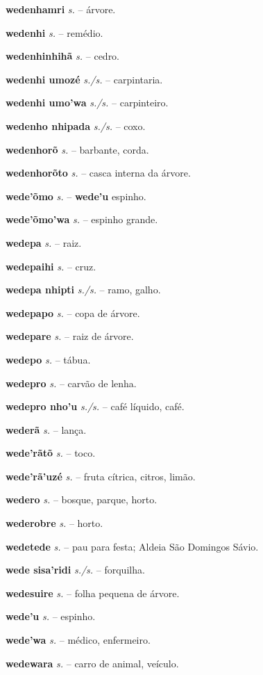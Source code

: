 \textbf{wedenhamri} \textit{s.} -- árvore.

\textbf{wedenhi} \textit{s.} -- remédio.

\textbf{wedenhinhihã} \textit{s.} -- cedro.

\textbf{wedenhi umozé} \textit{s./s.} -- carpintaria.

\textbf{wedenhi umo'wa} \textit{s./s.} -- carpinteiro.

\textbf{wedenho nhipada} \textit{s./s.} -- coxo.

\textbf{wedenhorõ} \textit{s.} -- barbante, corda.

\textbf{wedenhorõto} \textit{s.} -- casca interna da árvore.

\textbf{wede'õmo} \textit{s.} -- \textbf{wede'u} espinho.

\textbf{wede'õmo'wa} \textit{s.} -- espinho grande.

\textbf{wedepa} \textit{s.} -- raiz.

\textbf{wedepaihi} \textit{s.} -- cruz.

\textbf{wedepa nhipti} \textit{s./s.} -- ramo, galho.

\textbf{wedepapo} \textit{s.} -- copa de árvore.

\textbf{wedepare} \textit{s.} -- raiz de árvore.

\textbf{wedepo} \textit{s.} -- tábua.

\textbf{wedepro} \textit{s.} -- carvão de lenha.

\textbf{wedepro nho'u} \textit{s./s.} -- café líquido, café.

\textbf{wederã} \textit{s.} -- lança.

\textbf{wede'rãtõ} \textit{s.} -- toco.

\textbf{wede'rã'uzé} \textit{s.} -- fruta cítrica, citros, limão.

\textbf{wedero} \textit{s.} -- bosque, parque, horto.

\textbf{wederobre} \textit{s.} -- horto.

\textbf{wedetede} \textit{s.} -- pau para festa; Aldeia São Domingos Sávio.

\textbf{wede sisa'ridi} \textit{s./s.} -- forquilha.

\textbf{wedesuire} \textit{s.} -- folha pequena de árvore.

\textbf{wede'u} \textit{s.} -- espinho.

\textbf{wede'wa} \textit{s.} -- médico, enfermeiro.

\textbf{wedewara} \textit{s.} -- carro de animal, veículo.


